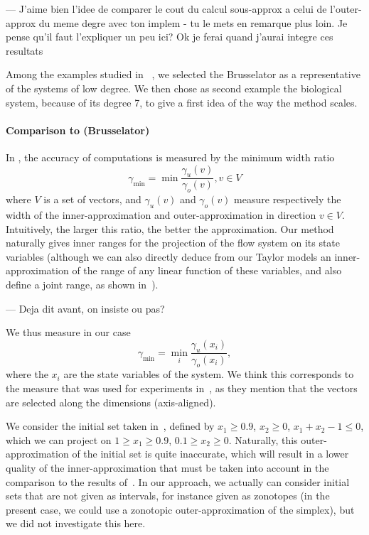 \documentclass{sig-alternate-05-2015} %
\newcommand\ForAuthors[1]%
 {\par\smallskip                     %
  \begin{center}%
   \fbox%
   {\parbox{0.9\linewidth}%
    {\raggedright\sc--- #1}%
   }%
  \end{center}%
  \par\smallskip                     %
 }
\begin{document}
\ForAuthors{J'aime bien l'idee de comparer le cout du calcul sous-approx
a celui de l'outer-approx du meme degre avec ton implem - tu le mets en
remarque plus loin. Je pense qu'il faut l'expliquer un peu ici?
Ok je ferai quand j'aurai integre ces resultats}

Among the examples studied in ~\cite{Underapproxflowpipes,underapprox16}, we selected
the Brusselator as a representative of the systems of low degree. 
We then chose as second example the biological system, because of its degree 7, to give a first idea of the way the method scales. 

\paragraph{Comparison to \cite{Underapproxflowpipes} (Brusselator)}
In  \cite{Underapproxflowpipes}, the  accuracy of computations is measured by the minimum width ratio 
\[ \gamma_{\min}=\min{\frac{\gamma_u(v)}{\gamma_o(v)}}, v \in V \]
where $V$ is a set of vectors, and $\gamma_u(v)$ and $\gamma_o(v)$ measure respectively the width of the inner-approximation and outer-approximation
in direction $v \in V$. 
Intuitively, the larger this ratio, the better the approximation. 
Our method naturally gives inner ranges for the projection of the flow system on its state variables (although we can also directly deduce from our Taylor models 
an inner-approximation of the range of any linear function of these variables, and also define a joint range, as shown in~\cite{hscc14,rc13}).
\ForAuthors{Deja dit avant, on insiste ou pas?} 
We thus measure in our case \[ \gamma_{\min}=\min_{i}{\frac{\gamma_u(x_i)}{\gamma_o(x_i)}}, \]
where the $x_i$ are the state variables of the system. We think this corresponds to the measure that was used for experiments 
in~\cite{Underapproxflowpipes}, as they mention that the vectors are selected along the dimensions (axis-aligned).


We consider the initial set taken in~\cite{Underapproxflowpipes}, defined by 
$x_1 \geq 0.9$, $x_2 \geq 0$, $x_1+x_2-1 \leq 0$, which we can project on $1 \geq x_1 \geq 0.9$, $0.1 \geq x_2 \geq 0$.
Naturally, this outer-approximation of the initial set is quite inaccurate, which will result in a lower quality of the inner-approximation
that must be taken into account in the comparison to the results of~\cite{Underapproxflowpipes}. In our approach, 
we actually can consider initial sets that are not given as intervals, for instance given as zonotopes 
(in the present case, we could use a zonotopic outer-approximation of the simplex),  
but we did not investigate this here. 
\end{document}
